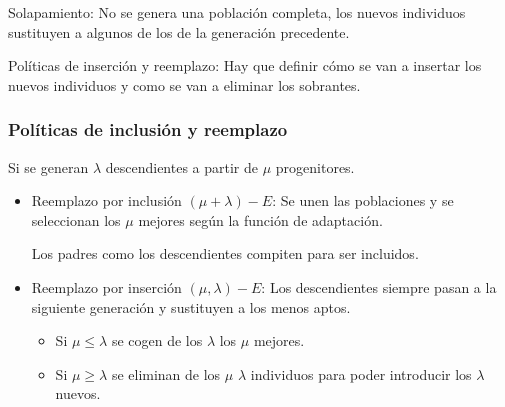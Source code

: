 \documentclass[12pt, twoside, openright]{report} %
\begin{document}
Solapamiento: No se genera una población completa, los nuevos individuos sustituyen a algunos de los de la generación precedente.

Políticas de inserción y reemplazo: Hay que definir cómo se van a insertar los nuevos individuos y como se van a eliminar los sobrantes.

\subsubsection{Políticas de inclusión y reemplazo}
Si se generan $\lambda$ descendientes a partir de $\mu$ progenitores.
\begin{itemize}
	\item Reemplazo por inclusión $(\mu + \lambda)-E$: Se unen las poblaciones y se seleccionan los $\mu$ mejores según la función de adaptación.
	
	Los padres como los descendientes compiten para ser incluidos.
	\item Reemplazo por inserción $(\mu, \lambda)-E$: Los descendientes siempre pasan a la siguiente generación y sustituyen a los menos aptos.
	\begin{itemize}
		\item Si $\mu \leq \lambda$ se cogen de los $\lambda$ los $\mu$ mejores.
		\item Si $\mu \geq \lambda$ se eliminan de los $\mu$ $\lambda$ individuos para poder introducir los $\lambda$ nuevos.
	\end{itemize}
\end{itemize}
\end{document}
